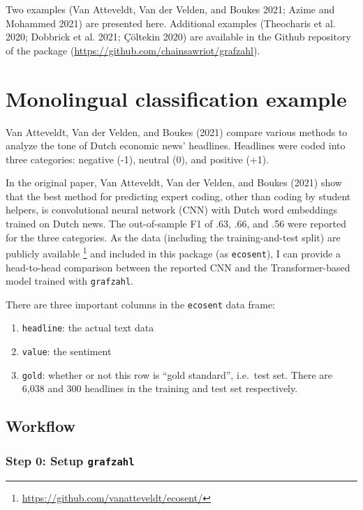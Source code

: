 \documentclass[
]{ccr}
\providecommand{\tightlist}{%
  \setlength{\itemsep}{0pt}\setlength{\parskip}{0pt}}\usepackage{longtable,booktabs,array}
\begin{document}
Two examples (Van Atteveldt, Van der Velden, and Boukes 2021; Azime and
Mohammed 2021) are presented here. Additional examples (Theocharis et
al. 2020; Dobbrick et al. 2021; Çöltekin 2020) are available in the
Github repository of the package
(\url{https://github.com/chainsawriot/grafzahl}).

\hypertarget{monolingual-classification-example}{%
\section{Monolingual classification
example}\label{monolingual-classification-example}}

Van Atteveldt, Van der Velden, and Boukes (2021) compare various methods
to analyze the tone of Dutch economic news' headlines. Headlines were
coded into three categories: negative (-1), neutral (0), and positive
(+1).

In the original paper, Van Atteveldt, Van der Velden, and Boukes (2021)
show that the best method for predicting expert coding, other than
coding by student helpers, is convolutional neural network (CNN) with
Dutch word embeddings trained on Dutch news. The out-of-sample F1 of
.63, .66, and .56 were reported for the three categories. As the data
(including the training-and-test split) are publicly available
\footnote{\url{https://github.com/vanatteveldt/ecosent/}} and included
in this package (as \texttt{ecosent}), I can provide a head-to-head
comparison between the reported CNN and the Transformer-based model
trained with \texttt{grafzahl}.

There are three important columns in the \texttt{ecosent} data frame:

\begin{enumerate}
\def\labelenumi{\arabic{enumi}.}
\tightlist
\item
  \texttt{headline}: the actual text data
\item
  \texttt{value}: the sentiment
\item
  \texttt{gold}: whether or not this row is ``gold standard'', i.e.~test
  set. There are 6,038 and 300 headlines in the training and test set
  respectively.
\end{enumerate}

\hypertarget{workflow}{%
\subsection{Workflow}\label{workflow}}

\hypertarget{step-0-setup-grafzahl}{%
\subsubsection{\texorpdfstring{Step 0: Setup
\texttt{grafzahl}}{Step 0: Setup grafzahl}}\label{step-0-setup-grafzahl}}
\end{document}

